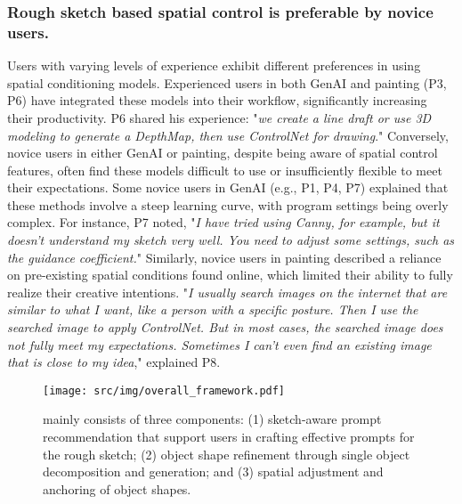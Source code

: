 \subsubsection{Rough sketch based spatial control is preferable by novice users.}
Users with varying levels of experience exhibit different preferences in using spatial conditioning models. 
Experienced users in both GenAI and painting (P3, P6) have integrated these models into their workflow, significantly increasing their productivity. 
P6 shared his experience: "\emph{we create a line draft or use 3D modeling to generate a DepthMap, then use ControlNet for drawing}."
Conversely, novice users in either GenAI or painting, despite being aware of spatial control features, often find these models difficult to use or insufficiently flexible to meet their expectations.
Some novice users in GenAI (e.g., P1, P4, P7) explained that these methods involve a steep learning curve, with program settings being overly complex. 
For instance, P7 noted, "\emph{I have tried using Canny, for example, but it doesn't understand my sketch very well. You need to adjust some settings, such as the guidance coefficient.}" 
Similarly, novice users in painting described a reliance on pre-existing spatial conditions found online, which limited their ability to fully realize their creative intentions. 
"\emph{I usually search images on the internet that are similar to what I want, like a person with a specific posture. Then I use the searched image to apply ControlNet. 
But in most cases, the searched image does not fully meet my expectations. 
Sometimes I can't even find an existing image that is close to my idea}," explained P8.

\begin{figure*}[t]
    \centering
    \texttt{[image: src/img/overall\_framework.pdf]}
    \vspace{-2mm}
    \caption{\tool mainly consists of three components: (1) sketch-aware prompt recommendation that support users in crafting effective prompts for the rough sketch; (2) object shape refinement through single object decomposition and generation; and (3) spatial adjustment and anchoring of object shapes.}
    \label{fig:workflow}
    \vspace{-4mm}
\end{figure*}

